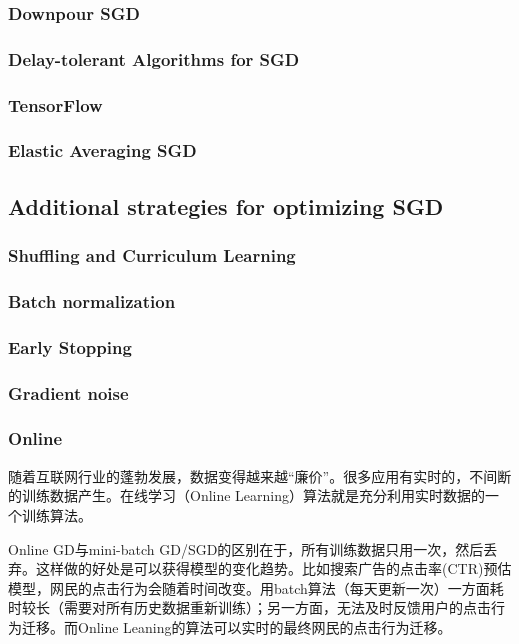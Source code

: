 \subsubsection{Downpour SGD}
\subsubsection{Delay-tolerant Algorithms for SGD}
\subsubsection{TensorFlow}

\subsubsection{Elastic Averaging SGD}
\subsection{Additional strategies for optimizing SGD}
\subsubsection{Shuffling and Curriculum Learning}
\subsubsection{Batch normalization}

\subsubsection{Early Stopping}
\subsubsection{Gradient noise}


\subsubsection{Online}
随着互联网行业的蓬勃发展，数据变得越来越``廉价''。很多应用有实时的，不间断的训练数据产生。在线学习（Online Learning）算法就是充分利用实时数据的一个训练算法。

Online GD与mini-batch GD/SGD的区别在于，所有训练数据只用一次，然后丢弃。这样做的好处是可以获得模型的变化趋势。比如搜索广告的点击率(CTR)预估模型，网民的点击行为会随着时间改变。用batch算法（每天更新一次）一方面耗时较长（需要对所有历史数据重新训练）；另一方面，无法及时反馈用户的点击行为迁移。而Online Leaning的算法可以实时的最终网民的点击行为迁移。

